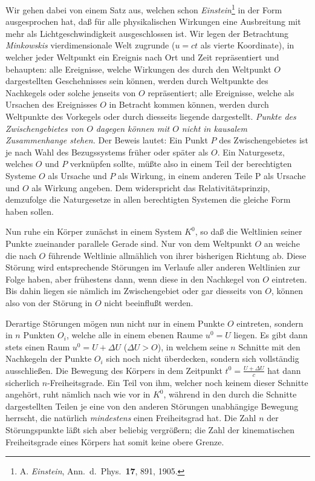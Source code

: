 \documentclass[12pt,a4paper]{article}
\begin{document}
Wir gehen dabei von einem Satz aus, welchen schon \emph{Einstein}\footnote[1]{A. \emph{Einstein}, Ann.\ d.\ Phys.\ \textbf{17}, 891, 1905.} in der Form ausgesprochen hat, daß für alle physikalischen Wirkungen eine Ausbreitung mit mehr als Lichtgeschwindigkeit ausgeschlossen ist.
Wir legen der Betrachtung \emph{Minkowskis} vierdimensionale Welt zugrunde ($u = ct$ als vierte Koordinate), in welcher jeder Weltpunkt ein Ereignis nach Ort und Zeit repräsentiert und behaupten: alle Ereignisse, welche Wirkungen des durch den Weltpunkt $O$ dargestellten Geschehnisses sein können, werden durch Weltpunkte des Nachkegels oder solche jenseits von $O$ repräsentiert; alle Ereignisse, welche als Ursachen des Ereignisses $O$ in Betracht kommen können, werden durch Weltpunkte des Vorkegels oder durch diesseits liegende dargestellt. \emph{Punkte des Zwischengebietes von $O$ dagegen können mit $O$ nicht in kausalem Zusammenhange stehen.} Der Beweis lautet:
Ein Punkt $P$ des Zwischengebietes ist je nach Wahl des Bezugssystems früher oder später als $O$.
Ein Naturgesetz, welches $O$ und $P$ verknüpfen sollte, müßte also in einem Teil der berechtigten Systeme $O$ als Ursache und $P$ als Wirkung, in einem anderen Teile P als Ursache und $O$ als Wirkung angeben. %
Dem widerspricht das Relativitätsprinzip, demzufolge die Naturgesetze in allen berechtigten Systemen die gleiche Form haben sollen.

Nun ruhe ein Körper zunächst in einem System $K^0$, so daß die Weltlinien seiner Punkte zueinander parallele Gerade sind.
Nur von dem Weltpunkt $O$ an weiche die nach $O$ führende Weltlinie allmählich von ihrer bisherigen Richtung ab.
Diese Störung wird entsprechende Störungen im Verlaufe aller anderen Weltlinien zur Folge haben, aber frühestens dann, wenn diese in den Nachkegel von $O$ eintreten.
Bis dahin liegen sie nämlich im Zwischengebiet oder gar diesseits von $O$, können also von der Störung in $O$ nicht beeinflußt werden.

Derartige Störungen mögen nun nicht nur in einem Punkte $O$ eintreten, sondern in $n$ Punkten $O_i$, welche alle in einem ebenen Raume $u^0 = U$ liegen.
Es gibt dann stets einen Raum $u^0 = U + \varDelta U$ ($\varDelta U > O$), in welchem seine $n$ Schnitte mit den Nachkegeln der Punkte $O_i$ sich noch nicht überdecken, sondern sich vollständig ausschließen. %
Die Bewegung des Körpers in dem Zeitpunkt $t^0 = \frac{U + \varDelta U}{c}$ hat dann sicherlich $n$-Freiheitsgrade.
Ein Teil von ihm, welcher noch keinem dieser Schnitte angehört, ruht nämlich nach wie vor in $K^0$, während in den durch die Schnitte dargestellten Teilen je eine von den anderen Störungen unabhängige Bewegung herrscht, die natürlich \emph{mindestens} einen Freiheitsgrad hat.
Die Zahl $n$ der Störungspunkte läßt sich aber beliebig vergrößern; die Zahl der kinematischen Freiheitsgrade eines Körpers hat somit keine obere Grenze.
\end{document}
